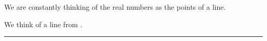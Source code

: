 

We are constantly thinking of the real numbers as the points of a line.


We think of a line from .
\par\noindent\rule{\textwidth}{0.4pt}


\blankpage
